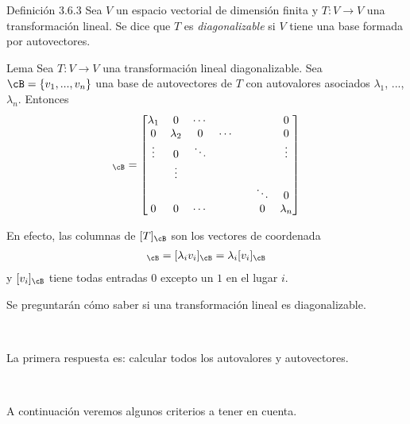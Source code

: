 \documentclass[handout]{beamer} %
\begin{document}
\begin{frame}
	\begin{block}{Definición  3.6.3}
		Sea $V$ un espacio vectorial de dimensión finita y $T:V\longrightarrow V$ una transformación lineal. Se dice que $T$ es \textit{diagonalizable} si $V$ tiene una base formada por autovectores.
	\end{block}
	
	
\end{frame}

\begin{frame}
	
	\begin{block}{Lema}
		Sea $T:V\longrightarrow V$ una transformación lineal diagonalizable. Sea $\cB=\{v_1, ..., v_n\}$ una base de autovectores de $T$ con autovalores asociados $\lambda_1$, ..., $\lambda_n$. Entonces 
		\begin{align*}
			[T]_\cB=
			\begin{bmatrix}
				\lambda_1 & 0 & \cdots & & &  & 0\\ 
				0 & \lambda_2 & 0& \cdots & &  & 0\\
				\vdots & 0 & \ddots & & &  & \vdots\\
				& \vdots &  & & & &  \\
				& &  & & &  \ddots&0\\
				0 & 0 & \cdots & & & 0 & \lambda_{n}
			\end{bmatrix}
		\end{align*}
	\end{block}
	
	En efecto, las columnas de $[T]_\cB$ son los vectores de coordenada
	\begin{align*}
		[T(v_i)]_\cB=[\lambda_i v_i]_\cB=\lambda_i[v_i]_\cB
	\end{align*}
	y $[v_i]_\cB$ tiene todas entradas $0$ excepto un $1$ en el lugar $i$.
	
\end{frame}

\begin{frame}
	Se preguntarán cómo saber si una transformación lineal es diagonalizable.\pause
	
	\
	
	La primera respuesta es: calcular todos los autovalores y autovectores.\pause
	
	\
	
	A continuación veremos algunos criterios a tener en cuenta.\pause
\end{frame}
\end{document}
